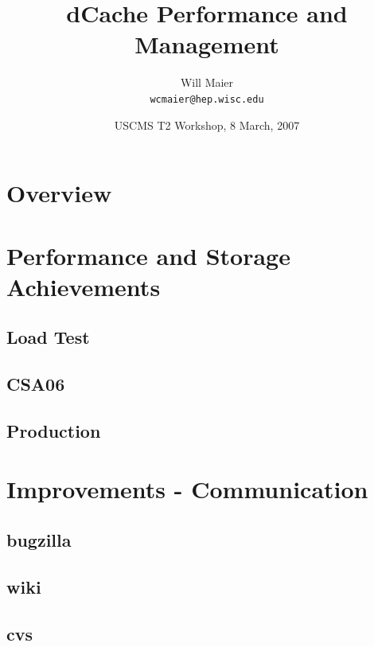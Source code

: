 \documentclass{beamer}
\title{dCache Performance and Management}
\author[Will Maier]{Will Maier \\ \texttt{wcmaier@hep.wisc.edu}}
\institute[Wisconsin]{University of Wisconsin - High Energy Physics}
\date[8 March, 2007]{USCMS T2 Workshop, 8 March, 2007}
\begin{document}
\begin{frame}
    \titlepage
\end{frame}

\section{Overview}
\begin{frame}
    \tableofcontents
\end{frame}

\section{Performance and Storage Achievements}
\subsection{Load Test}
\begin{frame}
\end{frame}

\subsection{CSA06}
\begin{frame}
\end{frame}

\subsection{Production}
\begin{frame}
\end{frame}

\section{Improvements - Communication}
\subsection{bugzilla}
\begin{frame}
\end{frame}

\subsection{wiki}
\begin{frame}
\end{frame}

\subsection{cvs}
\begin{frame}
\end{frame}
\end{document}
